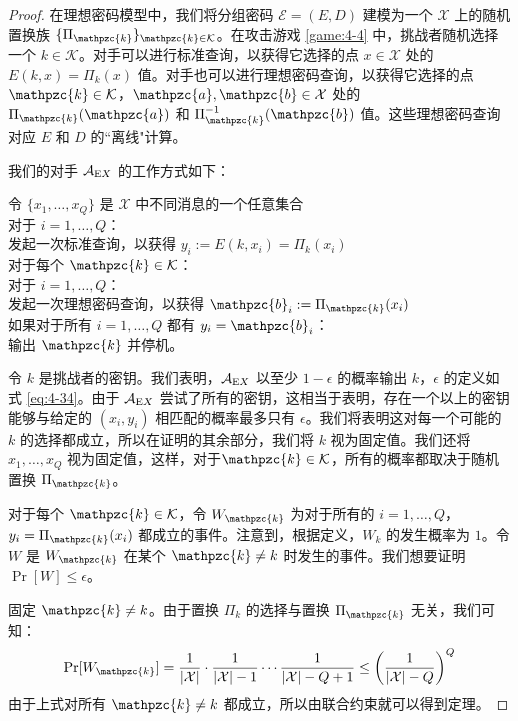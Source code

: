 \begin{proof}
在理想密码模型中，我们将分组密码 $\mathcal{E}=(E,D)$ 建模为一个 $\mathcal{X}$ 上的随机置换族 $\{\Pi_\mathpzc{k}\}_{\mathpzc{k}\in\mathcal{K}}$。在攻击游戏 \ref{game:4-4} 中，挑战者随机选择一个 $k\in\mathcal{K}$。对手可以进行标准查询，以获得它选择的点 $x\in\mathcal{X}$ 处的 $E(k,x)=\Pi_k(x)$ 值。对手也可以进行理想密码查询，以获得它选择的点 $\mathpzc{k}\in\mathcal{K}$，$\mathpzc{a},\mathpzc{b}\in\mathcal{X}$ 处的 $\Pi_\mathpzc{k}(\mathpzc{a})$ 和 $\Pi_\mathpzc{k}^{-1}(\mathpzc{b})$ 值。这些理想密码查询对应 $E$ 和 $D$ 的``离线"计算。

我们的对手 $\mathcal{A}_{{\rm E}X}$ 的工作方式如下：

\vspace{5pt}

\hspace*{5pt} 令 $\{x_1,\dots,x_Q\}$ 是 $\mathcal{X}$ 中不同消息的一个任意集合\\
\hspace*{26pt} 对于 $i=1,\dots,Q$：\\
\hspace*{50pt} 发起一次标准查询，以获得 $y_i:=E(k,x_i)=\Pi_k(x_i)$\\
\hspace*{26pt} 对于每个 $\mathpzc{k}\in\mathcal{K}$：\\
\hspace*{50pt} 对于 $i=1,\dots,Q$：\\
\hspace*{75pt} 发起一次理想密码查询，以获得 $\mathpzc{b}_i:=\Pi_\mathpzc{k}(x_i)$\\
\hspace*{50pt} 如果对于所有 $i=1,\dots,Q$ 都有 $y_i=\mathpzc{b}_i$：\\
\hspace*{75pt} 输出 $\mathpzc{k}$ 并停机。

\vspace{5pt}

\noindent
令 $k$ 是挑战者的密钥。我们表明，$\mathcal{A}_{{\rm E}X}$ 以至少 $1-\epsilon$ 的概率输出 $k$，$\epsilon$ 的定义如式 \ref{eq:4-34}。由于 $\mathcal{A}_{{\rm E}X}$ 尝试了所有的密钥，这相当于表明，存在一个以上的密钥能够与给定的 $(x_i,y_i)$ 相匹配的概率最多只有 $\epsilon$。我们将表明这对每一个可能的 $k$ 的选择都成立，所以在证明的其余部分，我们将 $k$ 视为固定值。我们还将 $x_1,\dots,x_Q$ 视为固定值，这样，对于$\mathpzc{k}\in\mathcal{K}$，所有的概率都取决于随机置换 $\Pi_\mathpzc{k}$。

对于每个 $\mathpzc{k}\in\mathcal{K}$，令 $W_\mathpzc{k}$ 为对于所有的 $i=1,\dots,Q$，$y_i=\Pi_\mathpzc{k}(x_i)$ 都成立的事件。注意到，根据定义，$W_k$ 的发生概率为 $1$。令 $W$ 是 $W_\mathpzc{k}$ 在某个 $\mathpzc{k}\neq k$ 时发生的事件。我们想要证明 $\Pr[W]\leq\epsilon$。

固定 $\mathpzc{k}\neq k$。由于置换 $\Pi_k$ 的选择与置换 $\Pi_\mathpzc{k}$ 无关，我们可知：
\[
\Pr[W_\mathpzc{k}]=
\frac{1}{|\mathcal{X}|}\cdot\frac{1}{|\mathcal{X}|-1}\cdots\frac{1}{|\mathcal{X}|-Q+1}
\leq
\left(
\frac{1}{|\mathcal{X}|-Q}
\right)
^Q
\]
由于上式对所有 $\mathpzc{k}\neq k$ 都成立，所以由联合约束就可以得到定理。
\end{proof}

